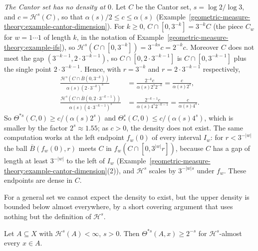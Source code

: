 \begin{example}\label{geometric-measure-theory:example-density-cantor}
\emph{The Cantor set has no density at $0$.} Let $C$ be the Cantor set, $s = \log 2/\log 3$, and $c = \mathcal{H}^s(C)$, so that $\alpha(s)/2 \leq c \leq \alpha(s)$
(Example~\ref{geometric-measure-theory:example-cantor-dimension}). For $k \geq 0$, $C \cap [0, 3^{-k}] = 3^{-k}C$ (the piece $C_w$ for $w = 1\cdots1$ of length $k$, in the notation of
Example~\ref{geometric-measure-theory:example-ifs}), so $\mathcal{H}^s(C \cap [0, 3^{-k}]) = 3^{-ks}c = 2^{-k}c$. Moreover $C$ does not meet the gap $(3^{-k-1}, 2 \cdot 3^{-k-1})$, so
$C \cap [0, 2 \cdot 3^{-k-1}]$ is $C \cap [0, 3^{-k-1}]$ plus the single point $2 \cdot 3^{-k-1}$. Hence, with $r = 3^{-k}$ and $r = 2 \cdot 3^{-k-1}$ respectively,
\[\begin{aligned}
\frac{\mathcal{H}^s(C \cap \overline{B}(0, 3^{-k}))}{\alpha(s)(2 \cdot 3^{-k})^s} &= \frac{2^{-k}c}{\alpha(s)2^s2^{-k}} = \frac{c}{\alpha(s)2^s}, \\
\frac{\mathcal{H}^s(C \cap \overline{B}(0, 2 \cdot 3^{-k-1}))}{\alpha(s)(4 \cdot 3^{-k-1})^s} &= \frac{2^{-k-1}c}{\alpha(s)4^s2^{-k-1}} = \frac{c}{\alpha(s)4^s}.
\end{aligned}\]
So $\Theta^{*s}(C, 0) \geq c/(\alpha(s)2^s)$ and $\Theta^s_*(C, 0) \leq c/(\alpha(s)4^s)$, which is smaller by the factor $2^s \approx 1.55$; as $c > 0$, the density does not exist. The same computation
works at the left endpoint $f_w(0)$ of every interval $I_w$: for $r < 3^{-|w|}$ the ball $\overline{B}(f_w(0), r)$ meets $C$ in $f_w(C \cap [0, 3^{|w|}r])$, because $C$ has a gap of length at least
$3^{-|w|}$ to the left of $I_w$ (Example~\ref{geometric-measure-theory:example-cantor-dimension}(2)), and $\mathcal{H}^s$ scales by $3^{-|w|s}$ under $f_w$. These endpoints are dense in $C$.
\end{example}

For a general set we cannot expect the density to exist, but the upper density is bounded below almost everywhere, by a short covering argument that uses nothing but the definition of $\mathcal{H}^s$.

\begin{theorem}\label{geometric-measure-theory:theorem-upper-density}
Let $A \subseteq X$ with $\mathcal{H}^s(A) < \infty$, $s > 0$. Then $\Theta^{*s}(A, x) \geq 2^{-s}$ for $\mathcal{H}^s$-almost every $x \in A$.
\end{theorem}

